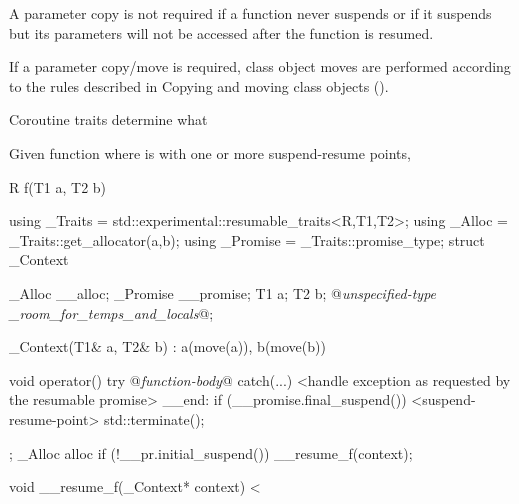 \enternote
A parameter copy is not required if a function never suspends or if it suspends but its parameters will
not be accessed after the function is resumed.
\exitnote

\pnum
If a parameter copy/move is required, class object moves are performed according to the rules described in Copying and moving class objects ().

\pnum
Coroutine traits determine what 


\pnum Given function  where  is  with one or more suspend-resume points, 

\begin{codeblock}
	R f(T1 a, T2 b) {
		using _Traits = std::experimental::resumable_traits<R,T1,T2>;
		using _Alloc = _Traits::get_allocator(a,b);
		using _Promise = _Traits::promise_type;
		struct _Context {
			_Alloc __alloc;
			_Promise __promise;
			T1 a;
			T2 b;
			@\textit{unspecified-type _room_for_temps_and_locals}@;
			
			_Context(T1& a, T2& b) : a(move(a)), b(move(b)) {}
			
			void operator() {
				try { 
					@\textit{function-body}@ 
				} catch(...) {
					<handle exception as requested by the resumable promise>
				}
				__end:  
				if (__promise.final_suspend()) {
					<suspend-resume-point>
					std::terminate();
				}			
			}
		};
		_Alloc alloc
		if (!__pr.initial_suspend()) {
			__resume_f(context);
		}
	}
	
	void __resume_f(_Context* context) {
	<
}
\end{codeblock}

%
